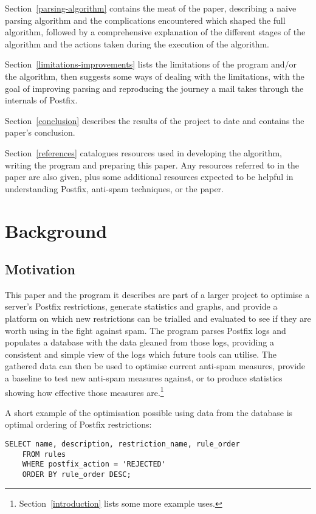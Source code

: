 \documentclass[a4paper,12pt,draft]{article}
\begin{document}
Section~\ref{parsing-algorithm} contains the meat of the paper, describing
a naive parsing algorithm and the complications encountered which shaped
the full algorithm, followed by a comprehensive explanation of the
different stages of the algorithm and the actions taken during the
execution of the algorithm.

Section~\ref{limitations-improvements} lists the limitations of the program
and/or the algorithm, then suggests some ways of dealing with the
limitations, with the goal of improving parsing and reproducing the journey
a mail takes through the internals of Postfix.

Section~\ref{conclusion} describes the results of the project to date and
contains the paper's conclusion.

Section~\ref{references} catalogues resources used in developing the
algorithm, writing the program and preparing this paper.  
Any resources referred to in the paper are also given, plus some additional
resources expected to be helpful in understanding Postfix, anti-spam
techniques, or the paper.

\section{Background}

\label{background}

\subsection{Motivation}

This paper and the program it describes are part of a larger project to
optimise a server's Postfix restrictions, generate statistics and graphs,
and provide a platform on which new restrictions can be trialled and
evaluated to see if they are worth using in the fight against spam.  The
program parses Postfix logs and populates a database with the data gleaned
from those logs, providing a consistent and simple view of the logs which
future tools can utilise.  The gathered data can then be used to optimise
current anti-spam measures, provide a baseline to test new anti-spam
measures against, or to produce statistics showing how effective those
measures are.\footnote{Section~\ref{introduction} lists some more example
uses.}

A short example of the optimisation possible using data from the database
is optimal ordering of Postfix restrictions:

\begin{verbatim}
SELECT name, description, restriction_name, rule_order
    FROM rules
    WHERE postfix_action = 'REJECTED'
    ORDER BY rule_order DESC;
\end{verbatim}
\end{document}
